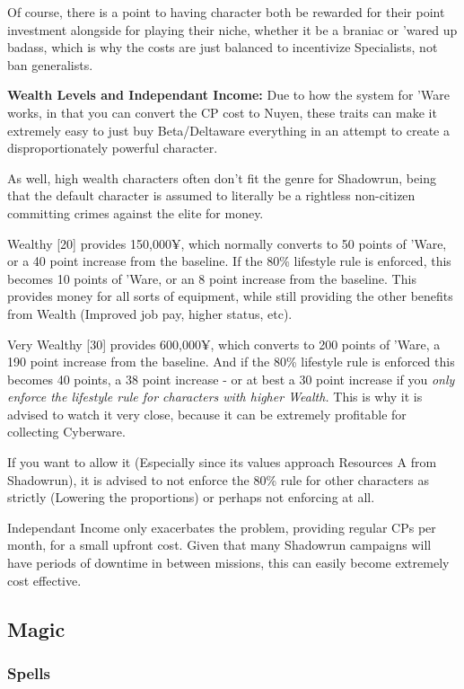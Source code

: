 \begin{multicols*}{2}
	Of course, there is a point to having character both be rewarded for their point investment alongside for playing their niche, whether it be a braniac or 'wared up badass, which is why the costs are just balanced to incentivize Specialists, not ban generalists.
	
	\textbf{Wealth Levels and Independant Income: } Due to how the system for 'Ware works, in that you can convert the CP cost to Nuyen, these traits can make it extremely easy to just buy Beta/Deltaware everything in an attempt to create a disproportionately powerful character.
	
	As well, high wealth characters often don't fit the genre for Shadowrun, being that the default character is assumed to literally be a rightless non-citizen committing crimes against the elite for money.
	
	Wealthy [20] provides 150,000¥, which normally converts to 50 points of 'Ware, or a 40 point increase from the baseline. If the 80\% lifestyle rule is enforced, this becomes 10 points of 'Ware, or an 8 point increase from the baseline. This provides money for all sorts of equipment, while still providing the other benefits from Wealth (Improved job pay, higher status, etc).
	
	Very Wealthy [30] provides 600,000¥, which converts to 200 points of 'Ware, a 190 point increase from the baseline. And if the 80\% lifestyle rule is enforced this becomes 40 points, a 38 point increase - or at best a 30 point increase if you \textit{only enforce the lifestyle rule for characters with higher Wealth.} This is why it is advised to watch it very close, because it can be extremely profitable for collecting Cyberware. 
	
	If you want to allow it (Especially since its values approach Resources A from Shadowrun), it is advised to not enforce the 80\% rule for other characters as strictly (Lowering the proportions) or perhaps not enforcing at all.
	
	Independant Income only exacerbates the problem, providing regular CPs per month, for a small upfront cost. Given that many Shadowrun campaigns will have periods of downtime in between missions, this can easily become extremely cost effective.
	
	\subsection{Magic}
	
	\subsubsection{Spells}
	

\end{multicols*}

